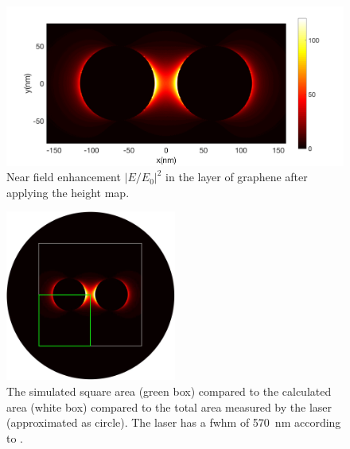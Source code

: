 \begin{figure}[!h]
  \centering
  \includegraphics[width=\textwidth]{./images/graphene-layer.png}
  \caption{Near field enhancement $|E/E_0|^2$ in the layer of graphene after applying the height map.}
\end{figure}

\begin{figure}[!h]
  \centering
  \includegraphics[width=0.5\textwidth]{./images/fwhm-chart.jpg}
  \caption{The simulated square area (green box) compared to the calculated area (white box) compared to the total area measured by the laser (approximated as circle). The laser has a fwhm of \SI{570}{nm} according to \cite{heeg}.}
\end{figure}

\newpage
\null
\newpage
